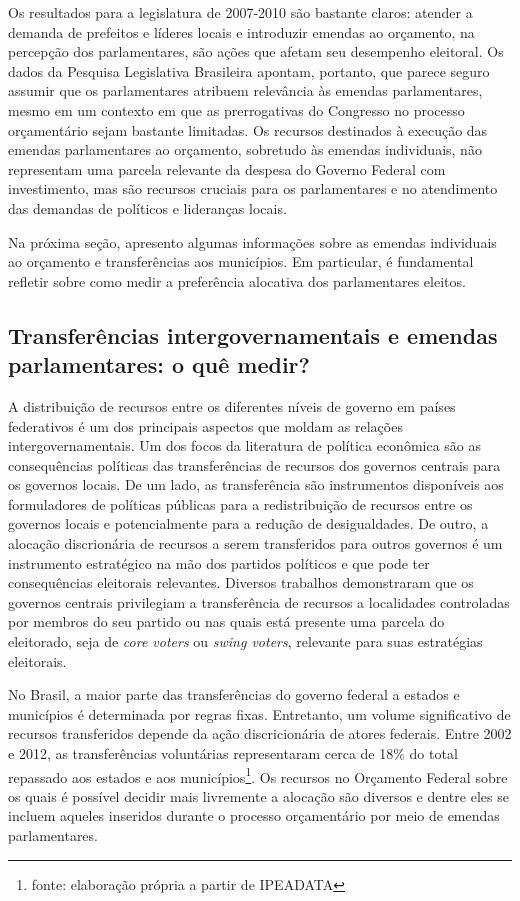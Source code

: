 Os resultados para a legislatura de 2007-2010 são bastante claros: atender a demanda de prefeitos e líderes locais e introduzir emendas ao orçamento, na percepção dos parlamentares, são ações que afetam seu desempenho eleitoral. Os dados da Pesquisa Legislativa Brasileira apontam, portanto, que parece seguro assumir que os parlamentares atribuem relevância às emendas parlamentares, mesmo em um contexto em que as prerrogativas do Congresso no processo orçamentário sejam bastante limitadas. Os recursos destinados à execução das emendas parlamentares ao orçamento, sobretudo às emendas individuais, não representam uma parcela relevante da despesa do Governo Federal com investimento, mas são recursos cruciais para os parlamentares e no atendimento das demandas de políticos e lideranças locais.

Na próxima seção, apresento algumas informações sobre as emendas individuais ao orçamento e transferências aos municípios. Em particular, é fundamental refletir sobre como medir a preferência alocativa dos parlamentares eleitos.

\subsection{Transferências intergovernamentais e emendas parlamentares: o quê medir?}

A distribuição de recursos entre os diferentes níveis de governo em países federativos é um dos principais aspectos que moldam as relações intergovernamentais. Um dos focos da literatura de política econômica são as consequências políticas das transferências de recursos dos governos centrais para os governos locais. De um lado, as transferência são instrumentos disponíveis aos formuladores de políticas públicas para a redistribuição de recursos entre os governos locais e potencialmente para a redução de desigualdades. De outro, a alocação discrionária de recursos a serem transferidos para outros governos é um instrumento estratégico na mão dos partidos políticos e que pode ter consequências eleitorais relevantes. Diversos trabalhos demonstraram que os governos centrais privilegiam a transferência de recursos a localidades controladas por membros do seu partido ou nas quais está presente uma parcela do eleitorado, seja de \textit{core voters} ou \textit{swing voters}, relevante para suas estratégias eleitorais.

No Brasil, a maior parte das transferências do governo federal a estados e municípios é determinada por regras fixas. Entretanto, um volume significativo de recursos transferidos depende da ação discricionária de atores federais. Entre 2002 e 2012, as transferências voluntárias representaram cerca de 18\% do total repassado aos estados e aos municípios\footnote{fonte: elaboração própria a partir de IPEADATA}. Os recursos no Orçamento Federal sobre os quais é possível decidir mais livremente a alocação são diversos e dentre eles se incluem aqueles inseridos durante o processo orçamentário por meio de emendas parlamentares.


